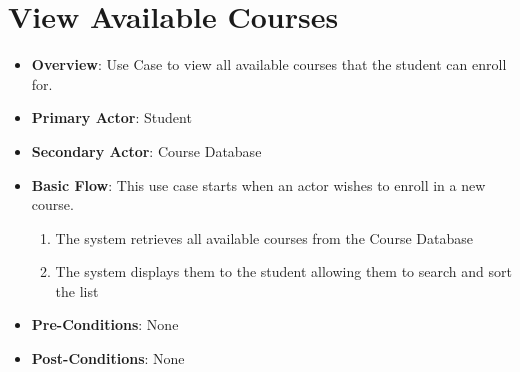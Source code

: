 \documentclass[12pt, a4]{report}
\begin{document}

\section{View Available Courses}
\begin{itemize}
    \item \textbf{Overview}: Use Case to view all available courses that the student can enroll for.
    \item \textbf{Primary Actor}: Student
    \item \textbf{Secondary Actor}: Course Database
    \item \textbf{Basic Flow}: This use case starts when an actor wishes to enroll in a new course.
        \begin{enumerate}
            \item The system retrieves all available courses from the Course Database
            \item The system displays them to the student allowing them to search and sort the list
        \end{enumerate}
    \item \textbf{Pre-Conditions}: None
    \item \textbf{Post-Conditions}: None
\end{itemize}
\end{document}
